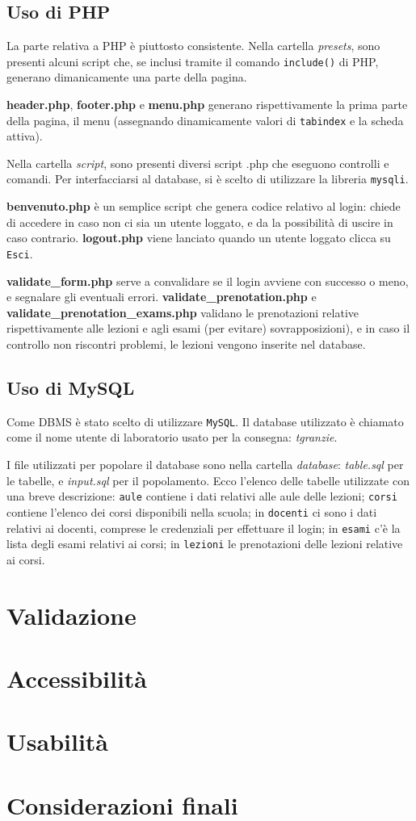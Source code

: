 \documentclass[12pt, a4paper]{article}
\begin{document}
\subsection{Uso di PHP}
La parte relativa a PHP è piuttosto consistente. Nella cartella \textit{presets}, sono presenti
alcuni script che, se inclusi tramite il comando \texttt{include()} di PHP, generano dimanicamente
una parte della pagina. \par
\smallskip
\textbf{header.php}, \textbf{footer.php} e \textbf{menu.php} generano rispettivamente la prima 
parte della pagina, il menu (assegnando dinamicamente valori di \texttt{tabindex} e la scheda attiva). \par
\smallskip
Nella cartella \textit{script}, sono presenti diversi script .php che eseguono controlli e comandi. Per interfacciarsi al database, si è scelto di utilizzare la libreria \texttt{mysqli}.\par
\smallskip
\textbf{benvenuto.php} è un semplice script che genera codice relativo al login: chiede di accedere
in caso non ci sia un utente loggato, e da la possibilità di uscire in caso contrario. \textbf{logout.php} viene lanciato quando un utente loggato clicca su \texttt{Esci}. \par
\textbf{validate\_form.php} serve a convalidare se il login avviene con successo o meno, e segnalare
gli eventuali errori. \mbox{\textbf{validate\_prenotation.php}} e \mbox{\textbf{validate\_prenotation\_exams.php}} validano le prenotazioni relative rispettivamente alle lezioni e agli esami (per 
evitare) sovrapposizioni), e in caso il controllo non riscontri problemi, le lezioni vengono inserite nel database.



\subsection{Uso di MySQL}
Come DBMS è stato scelto di utilizzare \texttt{MySQL}. Il database utilizzato è chiamato 
come il nome utente di laboratorio usato per la consegna: \textit{tgranzie}.\par 
I file utilizzati per popolare il database sono nella cartella \mbox{\textit{database}}:
\mbox{\textit{table.sql}} per le tabelle, e \mbox{\textit{input.sql}} per il popolamento. 
Ecco l'elenco delle tabelle utilizzate con una breve descrizione: \texttt{aule} contiene 
i dati relativi alle aule delle lezioni; \texttt{corsi} 
contiene l'elenco dei corsi disponibili nella scuola; in \texttt{docenti} ci sono i dati relativi 
ai docenti, comprese le credenziali per effettuare il login; in \texttt{esami} c'è la lista degli
esami relativi ai corsi; in \texttt{lezioni} le prenotazioni delle lezioni relative ai corsi.


\section{Validazione}

\section{Accessibilità}

\section{Usabilità}

\section{Considerazioni finali}
\end{document}
